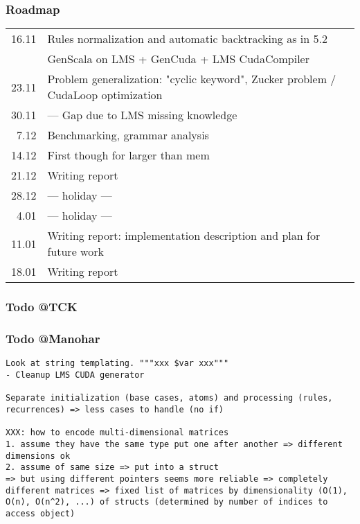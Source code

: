 \documentclass[11pt]{article}
\begin{document}
\subsubsection*{Roadmap}
\begin{tabular}{rl}
16.11 & Rules normalization and automatic backtracking as in 5.2 \\
	& GenScala on LMS + GenCuda + LMS CudaCompiler \\
23.11 & Problem generalization: "cyclic keyword", Zucker problem / CudaLoop optimization \\
30.11 &--- Gap due to LMS missing knowledge \\
7.12 & Benchmarking, grammar analysis \\
14.12 & First though for larger than mem \\
21.12 & Writing report \\
28.12 & --- holiday --- \\
 4.01 & --- holiday --- \\
11.01 & Writing report: implementation description and plan for future work \\
18.01 & Writing report
\end{tabular}

\subsubsection*{Todo @TCK}
\subsubsection*{Todo @Manohar}
\begin{verbatim}
Look at string templating. """xxx $var xxx"""
- Cleanup LMS CUDA generator

Separate initialization (base cases, atoms) and processing (rules, recurrences) => less cases to handle (no if)

XXX: how to encode multi-dimensional matrices
1. assume they have the same type put one after another => different dimensions ok
2. assume of same size => put into a struct
=> but using different pointers seems more reliable => completely different matrices => fixed list of matrices by dimensionality (O(1), O(n), O(n^2), ...) of structs (determined by number of indices to access object)
\end{verbatim}
\end{document}
